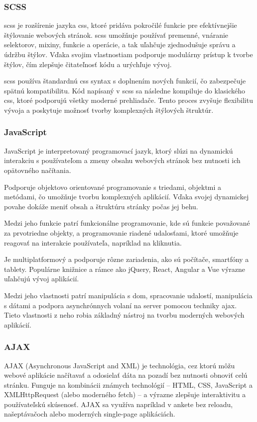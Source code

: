 \subsubsection{SCSS}
\acrfull{scss} je rozšírenie jazyka \acrshort{css}, ktoré pridáva pokročilé funkcie pre efektívnejšie štýlovanie webových stránok. 
\acrshort{scss} umožňuje používať premenné, vnáranie selektorov, mixiny, funkcie a operácie, a tak uľahčuje zjednodušuje správu a údržbu štýlov.
 Vďaka svojim vlastnostiam podporuje modulárny prístup k tvorbe štýlov, čím zlepšuje čitateľnosť kódu a urýchľuje vývoj.

 \acrshort{scss} používa štandardnú \acrshort{css} syntax s doplnením nových funkcií, čo zabezpečuje spätnú kompatibilitu.
 Kód napísaný v \acrshort{scss} sa následne kompiluje do klasického \acrshort{css}, ktoré podporujú všetky moderné prehliadače. 
Tento proces zvyšuje flexibilitu vývoja a poskytuje možnosť tvorby komplexných štýlových štruktúr.\cite{scss}
\subsubsection{JavaScript}
JavaScript je interpretovaný programovací jazyk, ktorý slúzi na dynamickú interakciu s používateľom a zmeny obsahu webových stránok bez nutnosti ich opätovného načítania.

Podporuje objektovo orientované programovanie s triedami, objektmi a metódami, čo umožňuje tvorbu komplexných aplikácií. Vďaka svojej dynamickej povahe dokáže meniť obsah a štruktúru stránky počas jej behu.

Medzi jeho funkcie patrí funkcionálne programovanie, kde sú funkcie považované za prvotriedne objekty, a programovanie riadené udalosťami, ktoré umožňuje reagovať na interakcie používateľa, napríklad na kliknutia.

Je multiplatformový a podporuje rôzne zariadenia, ako sú počítače, smartfóny a tablety. Populárne knižnice a rámce ako jQuery, React, Angular a Vue výrazne uľahčujú vývoj aplikácií.

Medzi jeho vlastnosti patrí manipulácia s \acrfull{dom}, spracovanie udalostí, manipulácia s dátami a podpora asynchrónnych volaní na server pomocou techniky \acrfull{ajax}.
 Tieto vlastnosti z neho robia základný nástroj na tvorbu moderných webových aplikácií.\cite{JavaScript}
 \subsubsection{AJAX}
 AJAX (Asynchronous JavaScript and XML) je technológia, cez ktorú môžu webové aplikácie načítavať a odosielať dáta na pozadí bez nutnosti obnoviť celú stránku.
  Funguje na kombinácii známych technológií – HTML, CSS, JavaScript a XMLHttpRequest (alebo moderného fetch) – a výrazne zlepšuje interaktivitu a používateľskú skúsenosť. 
 AJAX sa využíva napríklad v ankete bez reloadu, našeptávačoch alebo moderných single-page aplikáciách.\cite{ajax}\cite{aipreklad}
